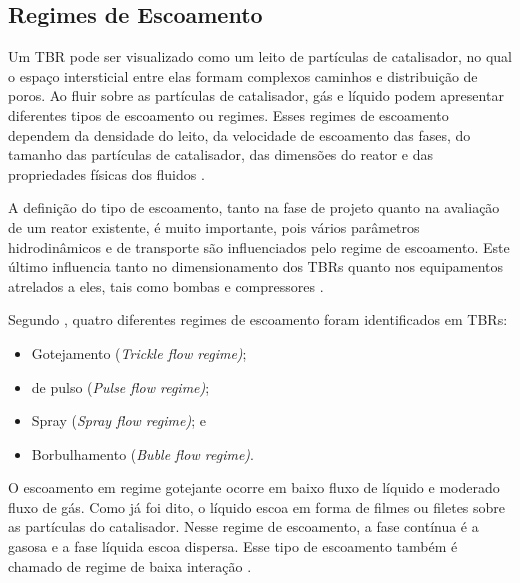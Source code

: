 \subsection {Regimes de Escoamento}
\label{sec:escoamento}

Um TBR pode ser visualizado como um leito de partículas de catalisador, no qual
o espaço intersticial entre elas formam complexos caminhos e distribuição de
poros. Ao fluir sobre as partículas de catalisador, gás e líquido podem
apresentar diferentes tipos de escoamento ou regimes. Esses regimes de
escoamento dependem da densidade do leito, da velocidade de escoamento das
fases, do tamanho das partículas de catalisador, das dimensões do reator e das
propriedades físicas dos fluidos \cite{Ranade2011}.

A definição do tipo de escoamento, tanto na fase de projeto quanto na avaliação
de um reator existente, é muito importante, pois vários parâmetros
hidrodinâmicos e de transporte são influenciados pelo regime de escoamento. Este
último influencia tanto no dimensionamento dos TBRs quanto nos
equipamentos atrelados a eles, tais como bombas e compressores
\cite{Ranade2011}.

Segundo , quatro
diferentes regimes de escoamento foram identificados em TBRs:

\begin{itemize}
	\item Gotejamento (\emph{Trickle flow regime)};
	\item de pulso (\emph{Pulse flow regime)};
	\item Spray (\emph{Spray flow regime)}; e
	\item Borbulhamento (\emph{Buble flow regime)}.
\end{itemize}



O escoamento em regime gotejante ocorre em baixo fluxo de líquido e moderado
fluxo de gás. Como já foi dito, o líquido escoa em forma de filmes ou filetes
sobre as partículas do catalisador. Nesse regime de escoamento, a fase contínua
é a gasosa e a fase líquida escoa dispersa. Esse tipo de escoamento também é
chamado de regime de baixa interação \cite{Saroha1996}.

